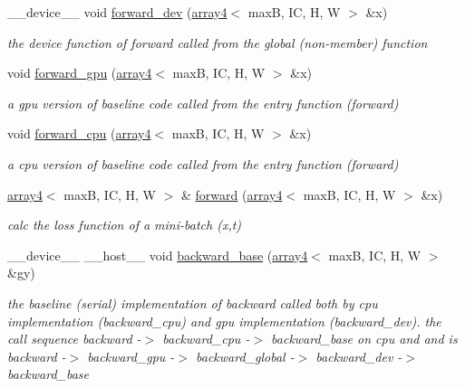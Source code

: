 \begin{DoxyCompactItemize}
\+\_\+\+\_\+device\+\_\+\+\_\+ void \hyperlink{structBatchNormalization_a5c35968b76ca1a166fe93aede17b53e8}{forward\+\_\+dev} (\hyperlink{structarray4}{array4}$<$ maxB, IC, H, W $>$ \&x)
\begin{DoxyCompactList}\small\item\em the device function of forward called from the global (non-\/member) function \end{DoxyCompactList}\item 
void \hyperlink{structBatchNormalization_a66c02d8d49ae80a8edd186024c04d42a}{forward\+\_\+gpu} (\hyperlink{structarray4}{array4}$<$ maxB, IC, H, W $>$ \&x)
\begin{DoxyCompactList}\small\item\em a gpu version of baseline code called from the entry function (forward) \end{DoxyCompactList}\item 
void \hyperlink{structBatchNormalization_a9490250c2e3469b619e76e5c913aa830}{forward\+\_\+cpu} (\hyperlink{structarray4}{array4}$<$ maxB, IC, H, W $>$ \&x)
\begin{DoxyCompactList}\small\item\em a cpu version of baseline code called from the entry function (forward) \end{DoxyCompactList}\item 
\hyperlink{structarray4}{array4}$<$ maxB, IC, H, W $>$ \& \hyperlink{structBatchNormalization_a315cda9d48dfa18a2f4f65ac7bb3b891}{forward} (\hyperlink{structarray4}{array4}$<$ maxB, IC, H, W $>$ \&x)
\begin{DoxyCompactList}\small\item\em calc the loss function of a mini-\/batch (x,t) \end{DoxyCompactList}\item 
\+\_\+\+\_\+device\+\_\+\+\_\+ \+\_\+\+\_\+host\+\_\+\+\_\+ void \hyperlink{structBatchNormalization_a0ef45335c50151f68de03d33b1d226ca}{backward\+\_\+base} (\hyperlink{structarray4}{array4}$<$ maxB, IC, H, W $>$ \&gy)
\begin{DoxyCompactList}\small\item\em the baseline (serial) implementation of backward called both by cpu implementation (backward\+\_\+cpu) and gpu implementation (backward\+\_\+dev). the call sequence backward -\/$>$ backward\+\_\+cpu -\/$>$ backward\+\_\+base on cpu and and is backward -\/$>$ backward\+\_\+gpu -\/$>$ backward\+\_\+global -\/$>$ backward\+\_\+dev -\/$>$ backward\+\_\+base \end{DoxyCompactList}\item 

\end{DoxyCompactItemize}
